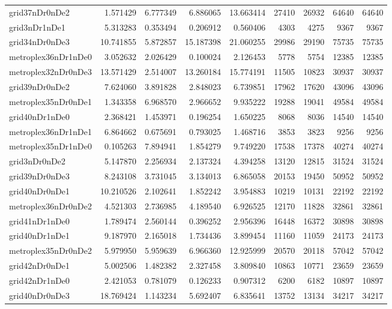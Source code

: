 \begin{longtable}{|l|r|r|r|r|r|r|r|r|}
grid37nDr0nDe2 & 1.571429 & 6.777349 & 6.886065 & 13.663414 & 27410 & 26932 & 64640 & 64640 \\
grid3nDr1nDe1 & 5.313283 & 0.353494 & 0.206912 & 0.560406 & 4303 & 4275 & 9367 & 9367 \\
grid34nDr0nDe3 & 10.741855 & 5.872857 & 15.187398 & 21.060255 & 29986 & 29190 & 75735 & 75735 \\
metroplex36nDr1nDe0 & 3.052632 & 2.026429 & 0.100024 & 2.126453 & 5778 & 5754 & 12385 & 12385 \\
metroplex32nDr0nDe3 & 13.571429 & 2.514007 & 13.260184 & 15.774191 & 11505 & 10823 & 30937 & 30937 \\
grid39nDr0nDe2 & 7.624060 & 3.891828 & 2.848023 & 6.739851 & 17962 & 17620 & 43096 & 43096 \\
metroplex35nDr0nDe1 & 1.343358 & 6.968570 & 2.966652 & 9.935222 & 19288 & 19041 & 49584 & 49584 \\
grid40nDr1nDe0 & 2.368421 & 1.453971 & 0.196254 & 1.650225 & 8068 & 8036 & 14540 & 14540 \\
metroplex36nDr1nDe1 & 6.864662 & 0.675691 & 0.793025 & 1.468716 & 3853 & 3823 & 9256 & 9256 \\
metroplex35nDr1nDe0 & 0.105263 & 7.894941 & 1.854279 & 9.749220 & 17538 & 17378 & 40274 & 40274 \\
grid3nDr0nDe2 & 5.147870 & 2.256934 & 2.137324 & 4.394258 & 13120 & 12815 & 31524 & 31524 \\
grid39nDr0nDe3 & 8.243108 & 3.731045 & 3.134013 & 6.865058 & 20153 & 19450 & 50952 & 50952 \\
grid40nDr0nDe1 & 10.210526 & 2.102641 & 1.852242 & 3.954883 & 10219 & 10131 & 22192 & 22192 \\
metroplex36nDr0nDe2 & 4.521303 & 2.736985 & 4.189540 & 6.926525 & 12170 & 11828 & 32861 & 32861 \\
grid41nDr1nDe0 & 1.789474 & 2.560144 & 0.396252 & 2.956396 & 16448 & 16372 & 30898 & 30898 \\
grid40nDr1nDe1 & 9.187970 & 2.165018 & 1.734436 & 3.899454 & 11160 & 11059 & 24173 & 24173 \\
metroplex35nDr0nDe2 & 5.979950 & 5.959639 & 6.966360 & 12.925999 & 20570 & 20118 & 57042 & 57042 \\
grid42nDr0nDe1 & 5.002506 & 1.482382 & 2.327458 & 3.809840 & 10863 & 10771 & 23659 & 23659 \\
grid42nDr1nDe0 & 2.421053 & 0.781079 & 0.126233 & 0.907312 & 6200 & 6182 & 10897 & 10897 \\
grid40nDr0nDe3 & 18.769424 & 1.143234 & 5.692407 & 6.835641 & 13752 & 13134 & 34217 & 34217 \\

\end{longtable}
